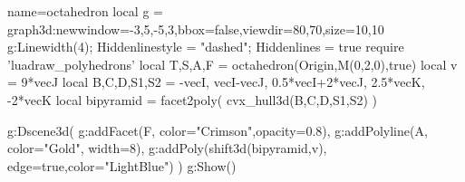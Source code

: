 \documentclass[border=2 mm]{standalone}
\begin{document}
\begin{luadraw}{name=octahedron}
local g = graph3d:new{window={-3,5,-5,3},bbox=false,viewdir={80,70},size={10,10}}
g:Linewidth(4); Hiddenlinestyle = "dashed"; Hiddenlines = true
require 'luadraw_polyhedrons'
local T,S,A,F =  octahedron(Origin,M(0,2,0),true)
local v = 9*vecJ
local B,C,D,S1,S2 = -vecI, vecI-vecJ, 0.5*vecI+2*vecJ, 2.5*vecK, -2*vecK
local bipyramid = facet2poly( cvx_hull3d({B,C,D,S1,S2}) )

g:Dscene3d(
    g:addFacet(F, {color="Crimson",opacity=0.8}),
    g:addPolyline(A, {color="Gold", width=8}),
    g:addPoly(shift3d(bipyramid,v), {edge=true,color="LightBlue"})
)
g:Show()
\end{luadraw} 
\end{document}

